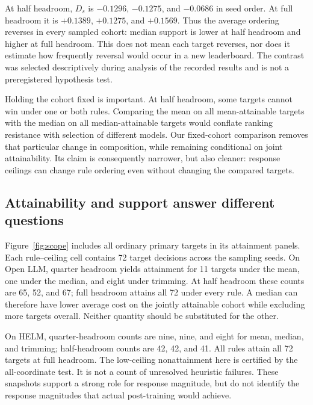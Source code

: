 \documentclass{article}
\begin{document}
At half headroom, $D_s$ is $-0.1296$, $-0.1275$, and $-0.0686$ in seed order. At full headroom it is $+0.1389$, $+0.1275$, and $+0.1569$. Thus the average ordering reverses in every sampled cohort: median support is lower at half headroom and higher at full headroom. This does not mean each target reverses, nor does it estimate how frequently reversal would occur in a new leaderboard. The contrast was selected descriptively during analysis of the recorded results and is not a preregistered hypothesis test.

Holding the cohort fixed is important. At half headroom, some targets cannot win under one or both rules. Comparing the mean on all mean-attainable targets with the median on all median-attainable targets would conflate ranking resistance with selection of different models. Our fixed-cohort comparison removes that particular change in composition, while remaining conditional on joint attainability. Its claim is consequently narrower, but also cleaner: response ceilings can change rule ordering even without changing the compared targets.

\subsection{Attainability and support answer different questions}
Figure~\ref{fig:scope} includes all ordinary primary targets in its attainment panels. Each rule--ceiling cell contains 72 target decisions across the sampling seeds. On Open LLM, quarter headroom yields attainment for 11 targets under the mean, one under the median, and eight under trimming. At half headroom these counts are 65, 52, and 67; full headroom attains all 72 under every rule. A median can therefore have lower average cost on the jointly attainable cohort while excluding more targets overall. Neither quantity should be substituted for the other.

On HELM, quarter-headroom counts are nine, nine, and eight for mean, median, and trimming; half-headroom counts are 42, 42, and 41. All rules attain all 72 targets at full headroom. The low-ceiling nonattainment here is certified by the all-coordinate test. It is not a count of unresolved heuristic failures. These snapshots support a strong role for response magnitude, but do not identify the response magnitudes that actual post-training would achieve.
\end{document}
